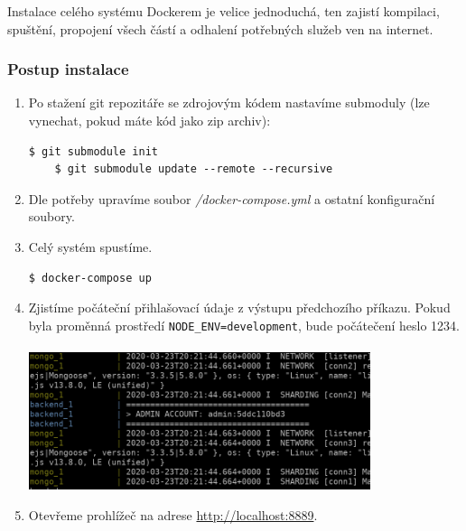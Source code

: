 \noindent
Instalace celého systému Dockerem je velice jednoduchá, ten zajistí kompilaci,
spuštění, propojení všech částí a odhalení potřebných služeb ven na internet. \citep[][]{DockerDocs}


\subsubsection*{Postup instalace}

\begin{enumerate}
  \setlength\itemsep{.05em}
  \item Po stažení git repozitáře se zdrojovým kódem nastavíme submoduly (lze vynechat, pokud máte kód jako zip archiv):\\
  \begin{lstlisting}[numbers=none]
    $ git submodule init
    $ git submodule update --remote --recursive
  \end{lstlisting}
  \item Dle potřeby upravíme soubor \textit{/docker-compose.yml} a ostatní konfigurační soubory.
  \item Celý systém spustíme.\\
  \begin{lstlisting}[numbers=none]
    $ docker-compose up
  \end{lstlisting}
  \item Zjistíme počáteční přihlašovací údaje z výstupu předchozího příkazu. Pokud byla proměnná prostředí \texttt{NODE\_ENV=development},
  bude počátečení heslo 1234.\\\\
  \includegraphics[width=100mm]{../img/installation_pass.png}\\
  \item Otevřeme prohlížeč na adrese \url{http://localhost:8889}.
\end{enumerate}

